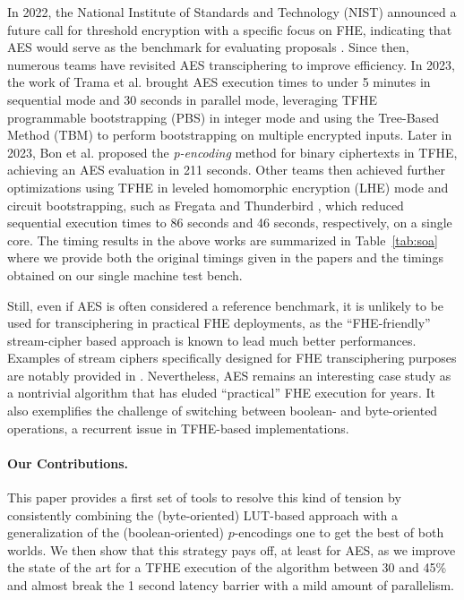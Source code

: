 In 2022, the National Institute of Standards and Technology (NIST) announced a future call for threshold encryption with a specific focus on FHE, indicating that AES would serve as the benchmark for evaluating proposals \cite{call_nist}. Since then, numerous teams have revisited AES transciphering to improve efficiency. In 2023, the work of Trama et al. \cite{DBLP:conf/wahc/TramaCBS23} brought AES execution times to under 5 minutes in sequential mode and 30 seconds in parallel mode, leveraging TFHE programmable bootstrapping (PBS) in integer mode and using the Tree-Based Method (TBM) \cite{Guimaraes_Borin_Aranha_2021} to perform bootstrapping on multiple encrypted inputs. Later in 2023, Bon et al. \cite{DBLP:journals/tches/BonPR24} proposed the \textit{p-encoding} method for binary ciphertexts in TFHE, achieving an AES evaluation in 211 seconds. Other teams then achieved further optimizations using TFHE in leveled homomorphic encryption (LHE) mode and circuit bootstrapping, such as Fregata \cite{fregata} and Thunderbird \cite{thunderbird}, which reduced sequential execution times to 86 seconds and 46 seconds, respectively, on a single core. 
The timing results in the above works are summarized in Table~\ref{tab:soa} where we provide both the original timings given in the papers and the timings obtained on our single machine test bench.

Still, even if AES is often considered a reference benchmark, it is unlikely to be used for transciphering in practical FHE deployments, as the {``FHE-friendly''} stream-cipher based approach {is known to lead} much better performances. Examples of stream ciphers specifically designed for FHE transciphering purposes are notably provided in \cite{kreyvium,kreyvium-2, transistor}. Nevertheless, AES remains an interesting case study as a nontrivial algorithm that has eluded ``practical'' FHE execution for years. It also exemplifies the challenge of switching between boolean- and byte-oriented operations, a recurrent issue in TFHE-based implementations.


\paragraph{Our Contributions.}
This paper provides a first set of tools to resolve this kind of tension by consistently combining the (byte-oriented) LUT-based approach with a generalization of the (boolean-oriented) $p$-encodings one to get the best of both worlds. We then show that this strategy pays off, at least for AES, as we improve the state of the art for a TFHE execution of the algorithm between 30 and 45\% and almost break the 1 second latency barrier with a mild amount of parallelism.

